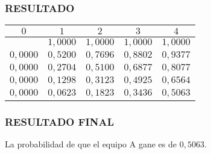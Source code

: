 \documentclass[10]{beamer}
\begin{document}
\begin{frame}
\color{white}
\frametitle{RESULTADO}
\begin{table}
 \begin{tabular}{ c | c  | c  | c  | c }
 \\  $0$ & $1$   & $2$   & $3$   & $4$  \\ 
 \hline \hline 
   & $1,0000$   & $1,0000$   & $1,0000$   & $1,0000$   \\ 
 $0,0000$ & $0,5200$   & $0,7696$   & $0,8802$   & $0,9377$   \\ 
 $0,0000$ & $0,2704$   & $0,5100$   & $0,6877$   & $0,8077$   \\ 
 $0,0000$ & $0,1298$   & $0,3123$   & $0,4925$   & $0,6564$   \\ 
 $0,0000$ & $0,0623$   & $0,1823$   & $0,3436$   & $0,5063$   \\ 
 \end{tabular}
 \end{table}
 \end{frame} 
\begin{frame}
\color{white}
\frametitle{RESULTADO FINAL}
La probabilidad de que el equipo A gane es de $0,5063$. \\\end{frame} 
\end{document}
